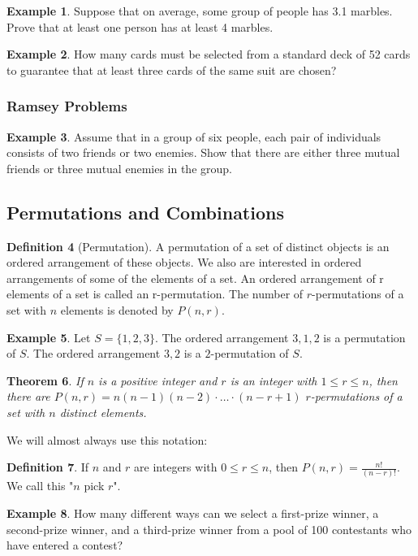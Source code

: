 \documentclass[letterpaper,10pt]{article}
\theoremstyle{plain}
\newtheorem{thm}{Theorem}[section]
\theoremstyle{definition}
\newtheorem{defn}[thm]{Definition}
\newtheorem{exmp}[thm]{Example}
\theoremstyle{remark}
\begin{document}
\begin{exmp} Suppose that on average, some group of people has 3.1 marbles. Prove that at least one person has at least 4 marbles.
\vspace{2cm}
\end{exmp}
\begin{exmp}
    How many cards must be selected from a standard deck of 52 cards to guarantee that at least three cards of the same suit are chosen?
\vspace{3cm}
\end{exmp}
\subsubsection{Ramsey Problems}
\begin{exmp}
    Assume that in a group of six people, each pair of individuals consists of two friends or two enemies. Show that there are either three mutual friends or three mutual enemies in the group.
    \vspace{3cm}
\end{exmp}

\newpage

\subsection{Permutations and Combinations}
\begin{defn}[Permutation]
A permutation of a set of distinct objects is an ordered arrangement of these objects.
We also are interested in ordered arrangements of some of the elements of a set. An ordered
arrangement of r elements of a set is called an r-permutation.
    The number of $r$-permutations of a set with $n$ elements is denoted by $P(n, r)$.


\end{defn}
\begin{exmp}
    Let $S = \{1, 2, 3\}$. The ordered arrangement $3, 1, 2$ is a permutation of $S$. The ordered arrangement $3, 2$ is a $2$-permutation of $S$.
\end{exmp}

\begin{thm}
    If $n$ is a positive integer and $r$ is an integer with $1 \leq r \leq n$, then there are $P(n, r) = n(n - 1)(n - 2) \cdot \ldots \cdot (n - r + 1)$ $r$-permutations of a set with $n$ distinct elements.
\end{thm}
We will almost always use this notation:
\begin{defn}
    If $n$ and $r$ are integers with $0 \leq r \leq n$, then $P(n, r) = \frac{n!}{(n - r)!}$. We call this "$n$ pick $r$".
\end{defn}
\begin{exmp}
How many different ways can we select a first-prize winner, a second-prize winner, and a third-prize winner from a pool of 100 contestants who have entered a contest?
\vspace{2cm}
\end{exmp}
\end{document}
